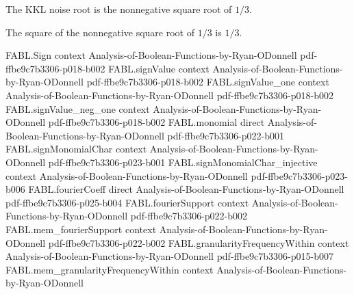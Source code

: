 \begin{definition}
\label{FABL.kklNoiseRoot}
\leanok
The KKL noise root is the nonnegative square root of $1/3$.
\end{definition}

\begin{theorem}
\label{FABL.kklNoiseRoot_sq}
\leanok
{}
The square of the nonnegative square root of $1/3$ is $1/3$.
\end{theorem}

\begin{theorem}
\label{FABL.fourthMoment_le_sq_of_slice}
\leanok
{}
\proofstep
  {FABL.Sign}
  {context}
  {Analysis-of-Boolean-Functions-by-Ryan-ODonnell}
  {pdf-ffbe9c7b3306-p018-b002}
\proofstep
  {FABL.signValue}
  {context}
  {Analysis-of-Boolean-Functions-by-Ryan-ODonnell}
  {pdf-ffbe9c7b3306-p018-b002}
\proofstep
  {FABL.signValue_one}
  {context}
  {Analysis-of-Boolean-Functions-by-Ryan-ODonnell}
  {pdf-ffbe9c7b3306-p018-b002}
\proofstep
  {FABL.signValue_neg_one}
  {context}
  {Analysis-of-Boolean-Functions-by-Ryan-ODonnell}
  {pdf-ffbe9c7b3306-p018-b002}
\proofstep
  {FABL.monomial}
  {direct}
  {Analysis-of-Boolean-Functions-by-Ryan-ODonnell}
  {pdf-ffbe9c7b3306-p022-b001}
\proofstep
  {FABL.signMonomialChar}
  {context}
  {Analysis-of-Boolean-Functions-by-Ryan-ODonnell}
  {pdf-ffbe9c7b3306-p023-b001}
\proofstep
  {FABL.signMonomialChar_injective}
  {context}
  {Analysis-of-Boolean-Functions-by-Ryan-ODonnell}
  {pdf-ffbe9c7b3306-p023-b006}
\proofstep
  {FABL.fourierCoeff}
  {direct}
  {Analysis-of-Boolean-Functions-by-Ryan-ODonnell}
  {pdf-ffbe9c7b3306-p025-b004}
\proofstep
  {FABL.fourierSupport}
  {context}
  {Analysis-of-Boolean-Functions-by-Ryan-ODonnell}
  {pdf-ffbe9c7b3306-p022-b002}
\proofstep
  {FABL.mem_fourierSupport}
  {context}
  {Analysis-of-Boolean-Functions-by-Ryan-ODonnell}
  {pdf-ffbe9c7b3306-p022-b002}
\proofstep
  {FABL.granularityFrequencyWithin}
  {context}
  {Analysis-of-Boolean-Functions-by-Ryan-ODonnell}
  {pdf-ffbe9c7b3306-p015-b007}
\proofstep
  {FABL.mem_granularityFrequencyWithin}
  {context}
  {Analysis-of-Boolean-Functions-by-Ryan-ODonnell}

\end{theorem}
